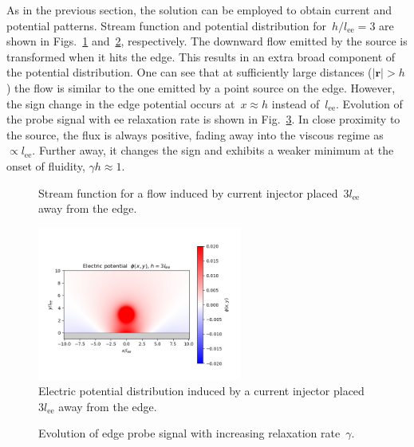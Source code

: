 \documentclass[preprint,aps,eqsecnum, prb]{revtex4-1}
\begin{document}
As in the previous section, the solution can be employed to obtain current
and potential patterns. Stream function and potential distribution
for~$h/l_\mathrm{ee} = 3$ are shown in Figs.~\ref{fig:bulk-stream}
and~\ref{fig:bulk-rho}, respectively.
The downward flow emitted by the source is transformed
when it hits the edge. This results in an extra broad component of
the potential distribution.
One can see that at sufficiently large distances ($|{\bm r}| > h$) the flow
is similar to the one emitted by a point source on the edge. However,
the sign change in the edge potential occurs at~$x \approx h$
instead of~$l_\mathrm{ee}$.
Evolution of the probe signal with ee relaxation rate is shown in
Fig.~\ref{fig:flux-vs-gamma-h}. In close proximity to the source,
the flux is always positive, fading away into the viscous regime
as~$\propto l_\mathrm{ee}$. Further away, it changes the sign
and exhibits a weaker minimum at the onset of fluidity, $\gamma h \approx 1$.
\begin{figure}
  \def\svgwidth{0.5\textwidth}
  
  \caption{
    \label{fig:bulk-stream}
    Stream function for a flow induced by current injector
     placed~$3l_\mathrm{ee}$ away from the edge.
  }
\end{figure}
\begin{figure}
  \includegraphics[width=0.6\textwidth]{potential-h=3.png}
  \caption{
    \label{fig:bulk-rho}
    Electric  potential distribution induced by a current injector
    placed~$3l_\mathrm{ee}$ away from the edge.
  }
\end{figure}
\begin{figure}
  \def\svgwidth{0.5\textwidth}
  
  \caption{
    \label{fig:flux-vs-gamma-h}
    Evolution of edge probe signal with increasing relaxation rate~$\gamma$.
  }
\end{figure}
%  
\end{document}
